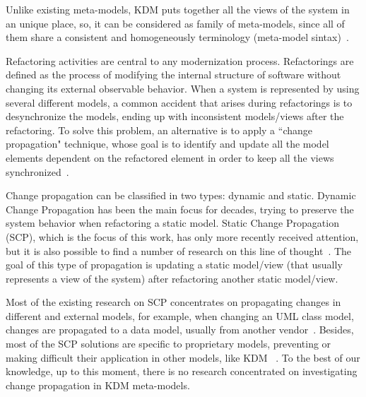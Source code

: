 
Unlike existing meta-models, KDM puts together all the  views of the system in an unique place, so, it can be considered as family of meta-models, since all of them share a consistent and homogeneously terminology (meta-model sintax)~\cite{murduck}. %

Refactoring activities are central to any modernization process. Refactorings are defined as the process of modifying the internal structure of software without changing its external observable behavior\cite{refactImpro}. When a system is represented by using several different models, a common accident that arises during refactorings is  to desynchronize the models, ending up with inconsistent models/views after the refactoring. To solve this problem, an alternative is to apply a ``change propagation"  technique, whose goal is to identify and update all the model elements dependent on the refactored element in order to keep all the views synchronized~\cite{4440135, Mens:2006:TMT:1706639.1706924, Mens:2006_NEW, Mens:2007}.

Change propagation can be classified in two types: dynamic and static. Dynamic  Change Propagation has been the main focus for decades, trying to preserve the system behavior when refactoring a static model. Static Change Propagation (SCP), which is the focus of this work, has only more recently received attention, but it is also possible to find a number of research on this line of thought~\cite{4440135, Mens:2006:TMT:1706639.1706924, Mens:2006_NEW, Mens:2007}. The goal of this type of propagation is updating a static model/view (that usually represents a view of the system) after refactoring another static model/view.  

Most of the existing research on SCP concentrates on propagating changes in different and external models, for example, when changing an UML class model, changes are propagated to a data model, usually from another vendor~\cite{Supporting_change_propagation_in_UML_models}. Besides, most of the SCP solutions are specific to proprietary models, preventing or making difficult their application in other models, like KDM ~\cite{4440135, Mens:2007}. To the best of our knowledge, up to this moment, there is no research concentrated on investigating change propagation in KDM meta-models.

